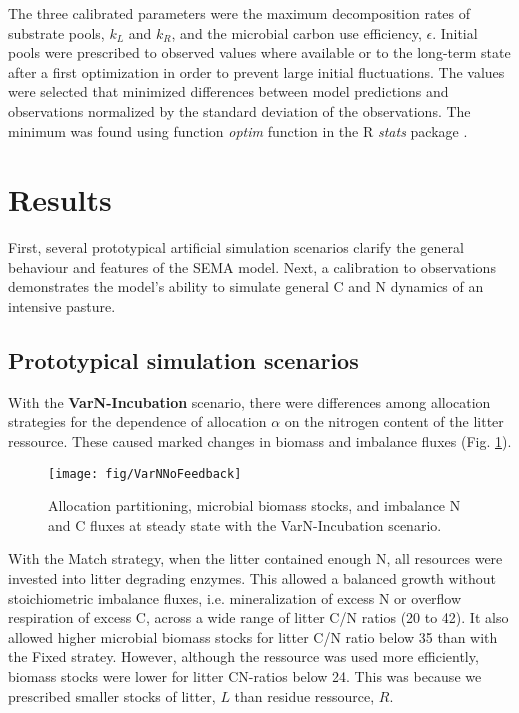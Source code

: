 The three calibrated parameters were the maximum decomposition rates of
substrate pools, $k_L$ and $k_R$, and the microbial carbon use efficiency,
$\epsilon$. Initial pools were prescribed to observed values where available or
to the long-term state after a first optimization in order to prevent large
initial fluctuations. The values were selected that minimized differences
between model predictions and observations normalized by the standard deviation
of the observations. The minimum was found using function \textit{optim}
function in the R \textit{stats} package \citep{R07}.
 
\section{Results}

First, several prototypical artificial simulation scenarios clarify the
general behaviour and features of the SEMA model. Next, a calibration to
observations demonstrates the model's ability to simulate general C and N
dynamics of an intensive pasture.

\subsection{Prototypical simulation scenarios}

With the \textbf{VarN-Incubation} scenario, there were differences among
allocation strategies for the dependence of allocation $\alpha$ on the nitrogen
content of the litter ressource. These caused marked changes in
biomass and imbalance fluxes (Fig.
\ref{fig:VarNNoFeedback}).

\begin{figure}[t]
\vspace*{2mm}
\begin{center}
\texttt{[image: fig/VarNNoFeedback]}
\end{center}
\caption{Allocation partitioning,
microbial biomass stocks, and imbalance N and C
fluxes at steady state with the VarN-Incubation scenario.
\label{fig:VarNNoFeedback}}
\end{figure}

With the Match strategy, when the litter contained enough N, all resources were
invested into litter degrading enzymes. This allowed a balanced growth without
stoichiometric imbalance fluxes, i.e. mineralization of excess N or overflow
respiration of excess C, across a wide range of litter C/N
ratios (20 to 42).
It also allowed higher microbial biomass stocks for litter C/N ratio below
35 than with the Fixed stratey. However, although the
ressource was used more efficiently, biomass stocks were lower for litter
CN-ratios below 24. This was because we prescribed smaller stocks of litter,
$L$ than residue ressource, $R$.

